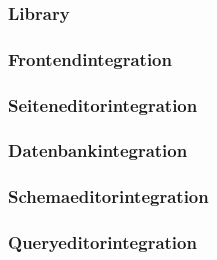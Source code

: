 \subsubsection{Library}



\subsubsection{Frontendintegration}



\subsubsection{Seiteneditorintegration}



\subsubsection{Datenbankintegration}



\subsubsection{Schemaeditorintegration}



\subsubsection{Queryeditorintegration}



